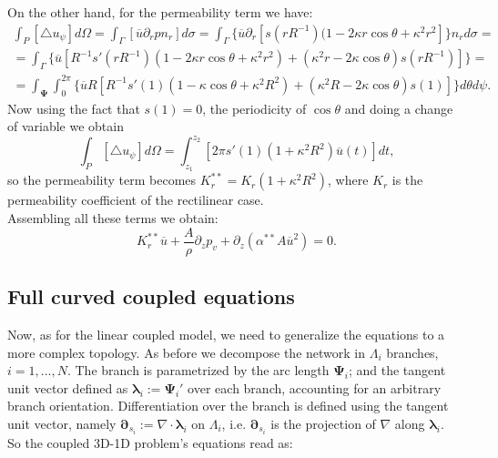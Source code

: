 \documentclass[a4paper]{report}
\begin{document}
On the other hand, for the permeability term we have:
	\begin{equation*}
	\begin{split}
	\int_P [\triangle u_{\psi}] d\Omega= \int_{\Gamma}[\overline{u}\partial_r p n_r] d\sigma= \int_{\Gamma}\{\overline{u}\partial_r[s(rR^{-1}) (1-2\kappa r \cos \theta+\kappa^2 r^2]\}n_r d\sigma=\\
=\int_{\Gamma}\{ \overline{u}[R^{-1} s'(rR^{-1})(1-2 \kappa r \cos \theta + \kappa^2 r^2)+(\kappa^2 r - 2 \kappa \cos \theta)s(r R^{-1})]\}= \\
=\int_{\boldsymbol{\Psi}}\int_0^{2\pi} \{ \overline{u}R[R^{-1}s'(1)(1-\kappa \cos \theta + \kappa^2 R^2) + (\kappa^2 R - 2 \kappa \cos \theta)s(1)] \} d\theta d\psi.
	\end{split}
	\end{equation*}
Now using the fact that $s(1)=0$, the periodicity of $\cos \theta$ and doing a change of variable we obtain
\begin{equation}
	\int_P [\triangle u_{\psi} ]d\Omega= \int_{z_1}^{z_2}[2 \pi s'(1) (1+\kappa^2 R^2) \overline{u}(t)]dt,
\end{equation}
so the permeability term becomes $K_r^{**}=K_r(1+\kappa^2 R^2)$, where $K_r$ is the permeability coefficient of the rectilinear case.\\
Assembling all these terms we obtain:
	\begin{equation}
	K_r^{**} \overline{u}+ \frac{A}{\rho} \partial_z p_v+ \partial_z (\alpha^{**} A \overline{u}^2) =0.
	\end{equation}

\subsection{Full curved coupled equations}
Now, as for the linear coupled model, we need to generalize the equations to a more complex topology. As before we decompose the network in $\Lambda_i$ branches, $i=1,...,N$. The branch is parametrized by the arc length $\boldsymbol{\Psi}_i$; and the tangent unit vector defined as $\boldsymbol{\lambda}_i:= \boldsymbol{\Psi}_i'$ over each branch, accounting for an arbitrary branch orientation. Differentiation over the branch is defined using the tangent unit vector, namely $\boldsymbol{\partial}_{s_i}:= \nabla \cdot \boldsymbol{\lambda}_i$ on $\Lambda_i$, i.e. $\boldsymbol{\partial}_{s_i}$ is the projection of $\nabla$ along $\boldsymbol{\lambda}_i$.\\
So the coupled 3D-1D problem's equations read as:
\end{document}
